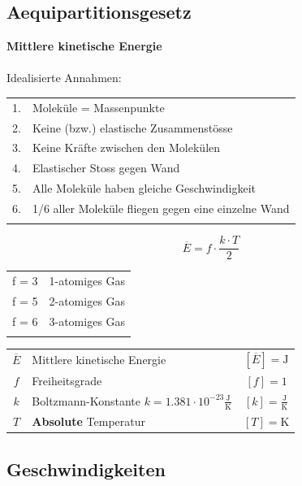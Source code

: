 \subsection{Aequipartitionsgesetz}

\textbf{Mittlere kinetische Energie} \\
\\
Idealisierte Annahmen: \\

\begin{tabular}{ll}
1. & Moleküle = Massenpunkte \\
2. & Keine (bzw.) elastische Zusammenstösse \\
3. & Keine Kräfte zwischen den Molekülen\\
4. & Elastischer Stoss gegen Wand \\
5. & Alle Moleküle haben gleiche Geschwindigkeit \\
6. & 1/6 aller Moleküle fliegen gegen eine einzelne Wand \\
\\
\end{tabular}


\begin{minipage}{0.48\linewidth}
$$ \boxed{ \overline{E} = f \cdot \frac{k \cdot T}{2} } $$
\end{minipage}
\hfill
\begin{minipage}{0.48\linewidth}
\begin{tabular}{ll}
f = 3 & 1-atomiges Gas \\
f = 5 & 2-atomiges Gas \\
f = 6 & 3-atomiges Gas \\
\\
\end{tabular}
\end{minipage}


\begin{tabular}{c l c}
	$\overline{E}$ & Mittlere kinetische Energie & $[\overline{E}] = \mathrm{J}$ \\
	$f$ & Freiheitsgrade & $[f] = \text{1}$ \\
	\rule{0pt}{8pt}$k$ & Boltzmann-Konstante $k = 1.381 \cdot 10^{-23} \mathrm{\frac{J}{K}}$ & $[k] = \mathrm{\frac{J}{K}}$ \\
	$T$ & \textbf{Absolute} Temperatur & $[T] = \mathrm{K}$ \\	
\end{tabular}


\subsection{Geschwindigkeiten}

